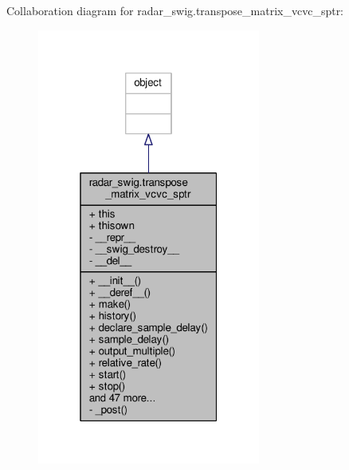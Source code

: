 Collaboration diagram for radar\+\_\+swig.\+transpose\+\_\+matrix\+\_\+vcvc\+\_\+sptr\+:
\nopagebreak
\begin{figure}[H]
\begin{center}
\leavevmode
\includegraphics[width=208pt]{d2/de9/classradar__swig_1_1transpose__matrix__vcvc__sptr__coll__graph}
\end{center}
\end{figure}
